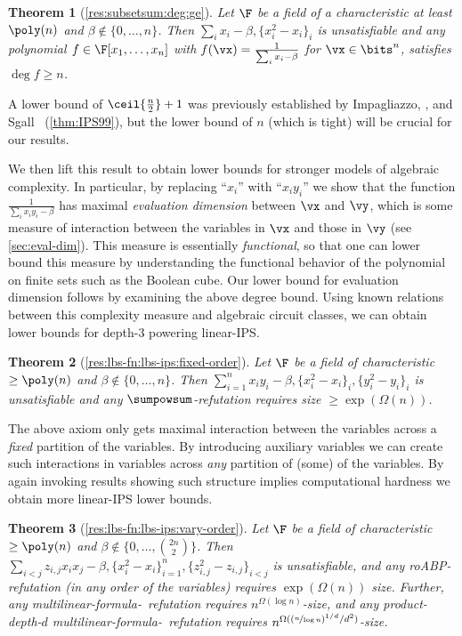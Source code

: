 \documentclass[11pt]{article}
\numberwithin{equation}{section}
\newtheorem{theorem}{Theorem}[section]
\theoremstyle{definition}
\theoremstyle{plain}
\begin{document}
\begin{theorem}[\autoref{res:subsetsum:deg:ge}]
        Let $\F$ be a field of a characteristic at least $\poly(n)$ and $\beta\notin\{0,\ldots,n\}$. Then $\sum_i x_i-\beta,\{x_i^2-x_i\}_i$ is unsatisfiable and any polynomial $f\in\F[x_1,\ldots,x_n]$ with $f(\vx)=\frac{1}{\sum_i x_i-\beta}$ for $\vx\in\bits^n$, satisfies $\deg f\ge n$.
\end{theorem}

A lower bound of $\ceil{\frac{n}{2}}+1$ was previously established by Impagliazzo, \Pudlak, and Sgall~\cite{IPS99} (\autoref{thm:IPS99}), but the lower bound of $n$ (which is tight) will be crucial for our results.

We then lift this result to obtain lower bounds for stronger models of algebraic complexity. In particular, by replacing ``$x_i$'' with ``$x_iy_i$'' we show that the function $\frac{1}{\sum_i x_iy_i-\beta}$ has maximal \emph{evaluation dimension} between $\vx$ and $\vy$, which is some measure of interaction between the variables in $\vx$ and those in $\vy$ (see \autoref{sec:eval-dim}).  This measure is essentially \emph{functional}, so that one can lower bound this measure by understanding the functional behavior of the polynomial on finite sets such as the Boolean cube. Our lower bound for evaluation dimension follows by examining the above degree bound. Using known relations between this complexity measure and algebraic circuit classes, we can obtain lower bounds for depth-3 powering linear-IPS.

\begin{theorem}[\autoref{res:lbs-fn:lbs-ips:fixed-order}]
        Let $\F$ be a field of characteristic $\ge\poly(n)$ and $\beta\notin\{0,\ldots,n\}$.  Then $\sum_{i=1}^n x_iy_i-\beta,\{x_i^2-x_i\}_i,\{y_i^2-y_i\}_i$ is unsatisfiable and any $\sumpowsum$-\lIPS refutation requires size $\ge\exp(\Omega(n))$.
\end{theorem}

The above axiom only gets maximal interaction between the variables across a \emph{fixed} partition of the variables.  By introducing auxiliary variables we can create such interactions in variables across \emph{any} partition of (some) of the variables.  By again invoking results showing such structure implies computational hardness we obtain more linear-IPS lower bounds.

\begin{theorem}[\autoref{res:lbs-fn:lbs-ips:vary-order}]
  Let $\F$ be a field of characteristic $\ge\poly(n)$ and $\beta\notin\{0,\ldots,\binom{2n}{2}\}$. Then $\sum_{i<j} z_{i,j}x_ix_j-\beta,\{x_i^2-x_i\}_{i=1}^n,\{z_{i,j}^2-z_{i,j}\}_{i<j}$ is unsatisfiable, and any roABP-\lIPS refutation (in any order of the variables)
requires $\exp(\Omega(n))$ size.
Further, any multilinear-formula-\IPS\ refutation requires $n^{\Omega(\log n)}$-size, and any product-depth-$d$ multilinear-formula-\IPS\ refutation requires $n^{\Omega((\nicefrac{n}{\log n})^{1/d}/d^2)}$-size.
\end{theorem}
\end{document}
